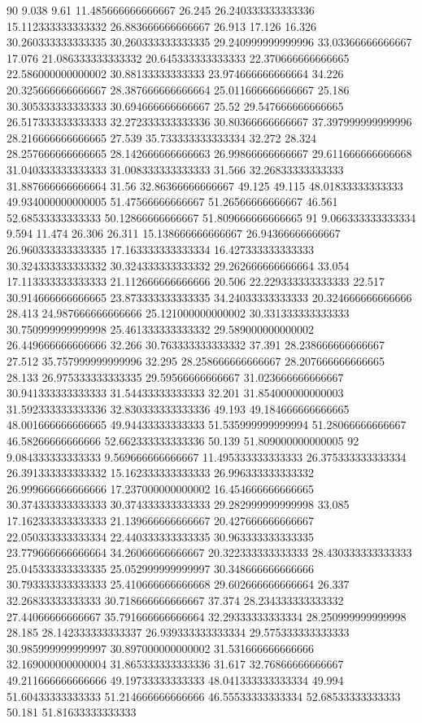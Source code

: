 90 9.038 9.61 11.485666666666667 26.245 26.240333333333336 15.112333333333332 26.883666666666667 26.913 17.126 16.326 30.260333333333335 30.260333333333335 29.240999999999996 33.03366666666667 17.076 21.086333333333332 20.645333333333333 22.370666666666665 22.586000000000002 30.88133333333333 23.974666666666664 34.226 20.325666666666667 28.387666666666664 25.011666666666667 25.186 30.305333333333333 30.694666666666667 25.52 29.547666666666665 26.517333333333333 32.272333333333336 30.80366666666667 37.397999999999996 28.216666666666665 27.539 35.733333333333334 32.272 28.324 28.257666666666665 28.142666666666663 26.99866666666667 29.611666666666668 31.040333333333333 31.008333333333333 31.566 32.26833333333333 31.887666666666664 31.56 32.86366666666667 49.125 49.115 48.01833333333333 49.934000000000005 51.47566666666667 51.26566666666667 46.561 52.68533333333333 50.12866666666667 51.809666666666665
91 9.066333333333334 9.594 11.474 26.306 26.311 15.138666666666667 26.94366666666667 26.960333333333335 17.163333333333334 16.427333333333333 30.324333333333332 30.324333333333332 29.262666666666664 33.054 17.113333333333333 21.112666666666666 20.506 22.229333333333333 22.517 30.914666666666665 23.873333333333335 34.24033333333333 20.324666666666666 28.413 24.987666666666666 25.121000000000002 30.331333333333333 30.750999999999998 25.461333333333332 29.589000000000002 26.449666666666666 32.266 30.763333333333332 37.391 28.238666666666667 27.512 35.757999999999996 32.295 28.258666666666667 28.207666666666665 28.133 26.975333333333335 29.59566666666667 31.023666666666667 30.941333333333333 31.54433333333333 32.201 31.854000000000003 31.592333333333336 32.830333333333336 49.193 49.184666666666665 48.001666666666665 49.94433333333333 51.535999999999994 51.28066666666667 46.58266666666666 52.662333333333336 50.139 51.809000000000005
92 9.084333333333333 9.569666666666667 11.495333333333333 26.375333333333334 26.391333333333332 15.162333333333333 26.996333333333332 26.999666666666666 17.237000000000002 16.454666666666665 30.374333333333333 30.374333333333333 29.282999999999998 33.085 17.162333333333333 21.139666666666667 20.427666666666667 22.050333333333334 22.440333333333335 30.963333333333335 23.779666666666664 34.26066666666667 20.322333333333333 28.430333333333333 25.045333333333335 25.052999999999997 30.348666666666666 30.793333333333333 25.410666666666668 29.602666666666664 26.337 32.26833333333333 30.718666666666667 37.374 28.234333333333332 27.44066666666667 35.791666666666664 32.29333333333334 28.250999999999998 28.185 28.142333333333337 26.939333333333334 29.575333333333333 30.985999999999997 30.897000000000002 31.531666666666666 32.169000000000004 31.865333333333336 31.617 32.76866666666667 49.211666666666666 49.19733333333333 48.041333333333334 49.994 51.60433333333333 51.214666666666666 46.55533333333334 52.68533333333333 50.181 51.81633333333333
